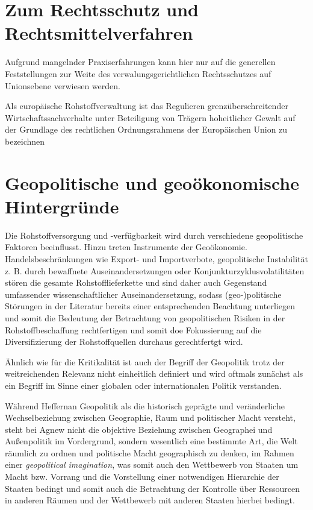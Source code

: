 \documentclass[12pt,a4paper,oneside]{book} %
\begin{document}
{	\section{Zum Rechtsschutz und Rechtsmittelverfahren}
	
	Aufgrund mangelnder Praxiserfahrungen kann hier nur auf die generellen Feststellungen zur Weite des verwalungsgerichtlichen Rechtsschutzes auf Unionsebene verwiesen werden.
	
	
	\glqq Als europäische Rohstoffverwaltung ist das Regulieren grenzüberschreitender Wirtschaftssachverhalte unter Beteiligung von Trägern hoheitlicher Gewalt auf der Grundlage des rechtlichen Ordnungsrahmens der Europäischen Union zu bezeichnen\grqq \autocite{Schorkopf, Europäische Rohstoffverwaltung, Rn. 2}
	
	\section{Geopolitische und geoökonomische Hintergründe}
	
	Die Rohstoffversorgung und -verfügbarkeit wird durch verschiedene geopolitische Faktoren beeinflusst.\autocite{Frenz 2025, 83} Hinzu treten Instrumente der Geoökonomie. Handelsbeschränkungen wie Export- und Importverbote, geopolitische Instabilität z. B. durch bewaffnete Auseinandersetzungen oder Konjunkturzyklusvolatilitäten stören die gesamte Rohstofflieferkette und sind daher auch Gegenstand umfassender wissenschaftlicher Auseinandersetzung, sodass (geo-)politische Störungen in der Literatur bereits einer entsprechenden Beachtung unterliegen und somit die Bedeutung der Betrachtung von geopolitischen Risiken in der Rohstoffbeschaffung rechtfertigen und somit doe Fokussierung auf die Diversifizierung der Rohstoffquellen durchaus gerechtfertgt wird.\autocite{Resilience of Critical Minerals Supply Chain, S. 9, 11}
	
	Ähnlich wie für die Kritikalität ist auch der Begriff der Geopolitik trotz der weitreichenden Relevanz nicht einheitlich definiert und wird oftmals zunächst als ein Begriff im Sinne einer globalen oder internationalen Politik verstanden.
	
	Während Heffernan\autocite{Heffernan 1998} Geopolitik als die historisch geprägte und veränderliche Wechselbeziehung zwischen Geographie, Raum und politischer Macht versteht, steht bei Agnew nicht die objektive Beziehung zwischen Geographei und Außenpolitik im Vordergrund, sondern wesentlich eine bestimmte Art, die Welt räumlich zu ordnen und politische Macht geographisch zu denken, im Rahmen einer \textit{geopolitical imagination}, was somit auch den Wettbewerb von Staaten um Macht bzw. Vorrang und die Vorstellung einer notwendigen Hierarchie der Staaten bedingt und somit auch die Betrachtung der Kontrolle über Ressourcen in anderen Räumen und der Wettbewerb mit anderen Staaten hierbei bedingt.\autocite{Agnew, J. (2003): Geopolitics. Re-visioning world politics.}
	
}
\end{document}
